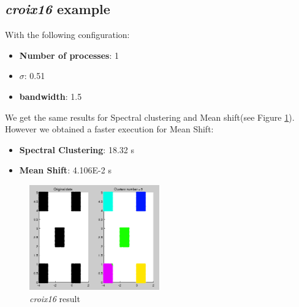 \subsection{\textit{croix16} example}
With the following configuration:
\begin{itemize}
\item \textbf{Number of processes}: 1
\item \textbf{$\sigma$}: 0.51
\item \textbf{bandwidth}: 1.5
\end{itemize}
We get the same results for Spectral clustering and Mean shift(see Figure \ref{croix16}). However we obtained a faster execution for Mean Shift:
\begin{itemize}
\item \textbf{Spectral Clustering}: 18.32 s
\item \textbf{Mean Shift}: 4.106E-2 s
\end{itemize}
\begin{figure}[h!]
\includegraphics[width=0.5\textwidth]{Image/croix16.png}\centering
\caption{\textit{croix16} result\label{croix16}}
\end{figure}